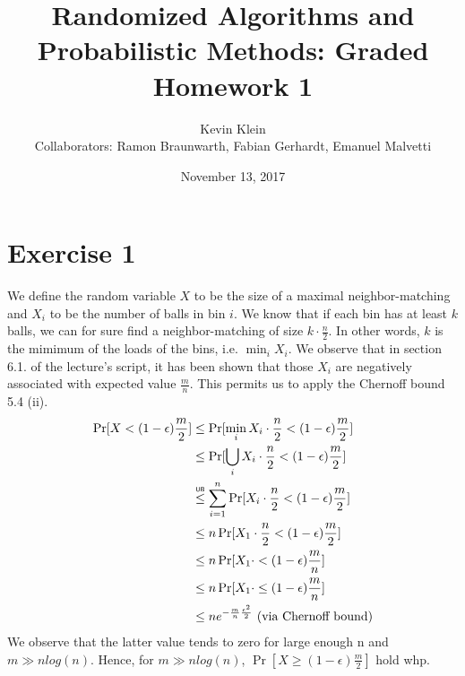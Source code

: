 \documentclass[a4paper,german]{article}
\title{Randomized Algorithms and Probabilistic Methods: Graded Homework 1}
\author{ Kevin Klein\\Collaborators: Ramon Braunwarth, Fabian Gerhardt, Emanuel Malvetti}
\date{November 13, 2017}
\newcommand\ub{\mathrel{\overset{\makebox[0pt]{\mbox{\normalfont\tiny\sffamily UB}}}{\leq}}}
\begin{document}
\maketitle

\section*{Exercise 1}
We define the random variable \(X\) to be the size of a maximal neighbor-matching and \(X_i\) to be the number of balls in bin \(i\). We know that if each bin has at least \(k\) balls, we can for sure find a neighbor-matching of size \(k \cdot \frac{n}{2}\). In other words, \(k\) is the mimimum of the loads of the bins, i.e. \(\min_i X_i\). We observe that in section 6.1. of the lecture's script, it has been shown that those \(X_i\) are negatively associated with expected value \(\frac{m}{n}\). This permits us to apply the Chernoff bound 5.4 (ii).
\begin{align*}
\Pr[X < (1-\epsilon)\frac{m}{2}] &\leq \Pr[\min_i X_i \cdot \frac{n}{2} < (1 - \epsilon) \frac{m}{2}] \\
& \leq \Pr[\bigcup_i X_i \cdot \frac{n}{2} < (1 - \epsilon) \frac{m}{2}] \\
& \ub \sum_{i=1}^n  \Pr[X_i \cdot \frac{n}{2} < (1 - \epsilon) \frac{m}{2}] \\
& \leq n  \Pr[X_1 \cdot \frac{n}{2} < (1 - \epsilon) \frac{m}{2}] \\
& \leq n  \Pr[X_1 \cdot < (1 - \epsilon) \frac{m}{n}] \\
& \leq n  \Pr[X_1 \cdot \leq (1 - \epsilon) \frac{m}{n}] \\
& \leq n e^{-\frac{m}{n} \frac{\epsilon^2}{2}} \text{     (via Chernoff bound)} \\
\end{align*}
We observe that the latter value tends to zero for large enough n and \(m \gg nlog(n)\). Hence, for \(m \gg nlog(n)\), \( \Pr[X \geq (1-\epsilon)\frac{m}{2}] \) hold whp.
\end{document}
